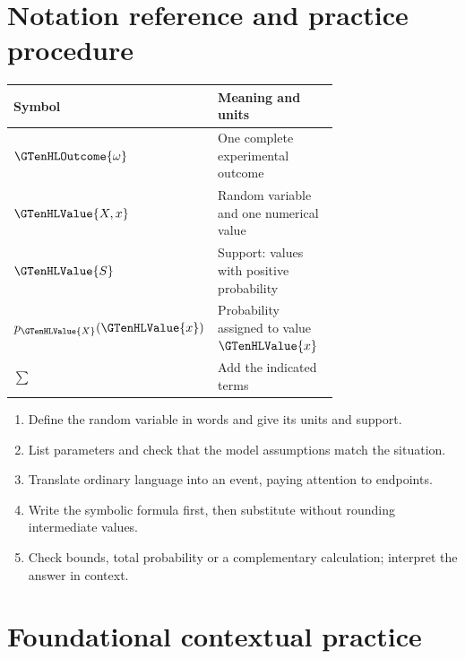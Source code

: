 \section{Notation reference and practice procedure}


\label{subsec:t2-c1-notation-reference}
\begin{center}
\begin{tabular}{lp{0.72\linewidth}}
\toprule
Symbol & Meaning and units \\ \midrule
$\GTenHLOutcome{\omega}$ & One complete experimental outcome \\
$\GTenHLValue{X,x}$ & Random variable and one numerical value \\
$\GTenHLValue{S}$ & Support: values with positive probability \\
$p_{\GTenHLValue{X}}(\GTenHLValue{x})$ & Probability assigned to value $\GTenHLValue{x}$ \\
$\sum$ & Add the indicated terms \\
\bottomrule
\end{tabular}
\end{center}
\label{subsec:t2-c1-practice-procedure}
\begin{enumerate}
\item Define the random variable in words and give its units and support.
\item List parameters and check that the model assumptions match the situation.
\item Translate ordinary language into an event, paying attention to endpoints.
\item Write the symbolic formula first, then substitute without rounding intermediate values.
\item Check bounds, total probability or a complementary calculation; interpret the answer in context.
\end{enumerate}
\section{Foundational contextual practice}\label{sec:t2-c1-foundational}


